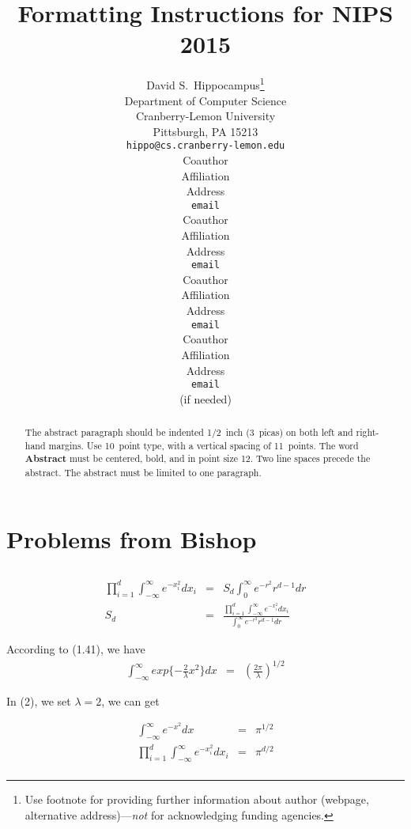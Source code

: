 \documentclass{article} %
\title{Formatting Instructions for NIPS 2015}
\author{
David S.~Hippocampus\thanks{ Use footnote for providing further information
about author (webpage, alternative address)---\emph{not} for acknowledging
funding agencies.} \\
Department of Computer Science\\
Cranberry-Lemon University\\
Pittsburgh, PA 15213 \\
\texttt{hippo@cs.cranberry-lemon.edu} \\
\And
Coauthor \\
Affiliation \\
Address \\
\texttt{email} \\
\AND
Coauthor \\
Affiliation \\
Address \\
\texttt{email} \\
\And
Coauthor \\
Affiliation \\
Address \\
\texttt{email} \\
\And
Coauthor \\
Affiliation \\
Address \\
\texttt{email} \\
(if needed)\\
}
\begin{document}
\maketitle

\begin{abstract}
The abstract paragraph should be indented 1/2~inch (3~picas) on both left and
right-hand margins. Use 10~point type, with a vertical spacing of 11~points.
The word \textbf{Abstract} must be centered, bold, and in point size 12. Two
line spaces precede the abstract. The abstract must be limited to one
paragraph.
\end{abstract}

\section{Problems from Bishop}


\subsection{}

\begin{equation}
    \begin{array}{rcl}
        \prod\limits_{i = 1}^{d}\int_{-\infty}^{\infty}e^{-x_i^2} d x_i& = & S_d\int_{0}^{\infty}e^{-r^2}r^{d-1}dr\\
                S_d  & = & \frac{\prod\limits_{i = 1}^{d}\int_{-\infty}^{\infty}e^{-x_i^2} d x_i}{\int_{0}^{\infty}e^{-r^2}r^{d-1}dr}
    \end{array}
\end{equation}

According to (1.41),  we have
\begin{equation}
    \begin{array}{rcl}
       \int_{-\infty}^{\infty} exp\{-\frac{2}{\lambda}x^2\} dx  & =  & (\frac{2\pi}{\lambda})^{1/2}
    \end{array}
\end{equation}

In (2), we set $\lambda = 2$, we can get

\begin{equation}
    \begin{array}{rcl}
       \int_{-\infty}^{\infty} e^{-x^2} dx  & =  & \pi^{1/2} \\
        \prod\limits_{i = 1}^{d}\int_{-\infty}^{\infty}e^{-x_i^2} d x_i& = & \pi^{d/2} \\
    \end{array}
\end{equation}
\end{document}
